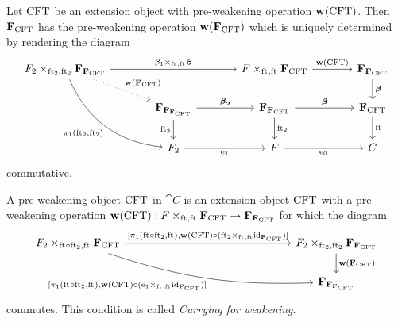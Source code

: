 \begin{defn}
Let $\mathrm{CFT}$ be an extension object with pre-weakening operation
$\mathbf{w}(\mathrm{CFT})$. Then $\mathbf{F}_{\mathrm{CFT}}$ has the pre-weakening operation
$\mathbf{w}(\mathbf{F}_{\mathrm{CFT}})$ which is uniquely determined by rendering the
diagram
\begin{equation*}
\begin{tikzcd}[column sep=large]
\cobesys{\stesysf_2}{\famesys{\famesys{\stesys}}}{\eft[2]}{\eft[2]}
  \ar{rr}{%
      \pullback{\beta_1}{\boldsymbol{\beta}}{\eft}{\eft}
    }
  \ar[bend right]{ddr}[swap]{\pullbackpr{1}{\eft[2]}{\eft[2]}}
  \ar[dotted]{dr}{\mathbf{w}(\famesys{\stesys})}
  &
  {}&
\cobesys{\stesysf}{\famesys{\stesys}}{\eft}{\eft}
  \ar{r}{\mathbf{w}(\stesys)}
  &
\famesys{\famesys{\stesys}}
  \ar{d}{\boldsymbol{\beta}}
  \\
  {}&
\famesys{\famesys{\famesys{\stesys}}}
  \ar{r}{\boldsymbol{\beta}_\mathbf{2}}
  \ar{d}[swap]{\eft[3]}
  &
\famesys{\famesys{\stesys}}
  \ar{d}{\eft[2]}
  \ar{r}{\boldsymbol{\beta}}
  &
\famesys{\stesys}
  \ar{d}{\eft}
  \\
  {}&
\stesysf_2
  \ar{r}[swap]{\efamext}
  &
\stesysf
  \ar{r}[swap]{\ectxext}
  &
\stesysc
\end{tikzcd}
\end{equation*}
commutative.
\end{defn}

\begin{defn}
A pre-weakening object $\mathrm{CFT}$ in $\cat{C}$ is an extension object $\mathrm{CFT}$ 
with a pre-weakening operation 
$ \mathbf{w}(\stesys)
    :
  \cobesys{\stesysf}{\famesys{\stesys}}{\eft}{\eft}
    \to
  \famesys{\famesys{\stesys}}$
for which the diagram
\begin{equation*}
\begin{tikzcd}[column sep=15em]
\cobesys{\stesysf_2}{\famesys{\stesys}}{\eft\circ\eft[2]}{\eft}
  \ar[bend right=10]{dr}[swap]%
    { [ \pullbackpr{1}{\eft\circ\eft[2]}{\eft},%
        \mathbf{w}(\stesys)%
          \circ%
        (\pullback{\efamext}{\catid{\famesys{\stesys}}}{\eft}{\eft})%
        ]%
      }
  \ar{r}{
    [ \pullbackpr{1}{\eft\circ\eft[2]}{\eft},%
      \mathbf{w}(\stesys)%
        \circ%
      (\pullback{\eft[2]}{\catid{\famesys{\stesys}}}{\eft}{\eft})%
      ]}%
  &
\cobesys{\stesysf_2}{\famesys{\famesys{\stesys}}}{\eft[2]}{\eft[2]}
  \ar{d}{\mathbf{w}(\famesys{\stesys})}
  \\
  {}&
\famesys{\famesys{\famesys{\stesys}}}
\end{tikzcd}
\end{equation*}
commutes. This condition is called \emph{Currying for weakening}.
\end{defn}

